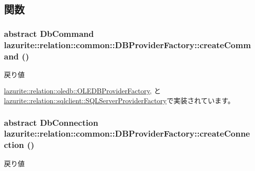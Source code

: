 \subsection{関数}
\hypertarget{classlazurite_1_1relation_1_1common_1_1_d_b_provider_factory_a80d5a53dcf06278b37133c7013f02f71}{
\subsubsection[{createCommand}]{\setlength{\rightskip}{0pt plus 5cm}abstract DbCommand lazurite::relation::common::DBProviderFactory::createCommand ()}}
\label{classlazurite_1_1relation_1_1common_1_1_d_b_provider_factory_a80d5a53dcf06278b37133c7013f02f71}
\begin{DoxyReturn}{戻り値}

\end{DoxyReturn}


\hyperlink{classlazurite_1_1relation_1_1oledb_1_1_o_l_e_d_b_provider_factory_a9cf2e12a8efe659885fd1e5fa014243f}{lazurite::relation::oledb::OLEDBProviderFactory}, と \hyperlink{classlazurite_1_1relation_1_1sqlclient_1_1_s_q_l_server_provider_factory_a2d33338154ebbd3abcfc8ca58aba0402}{lazurite::relation::sqlclient::SQLServerProviderFactory}で実装されています。\hypertarget{classlazurite_1_1relation_1_1common_1_1_d_b_provider_factory_a0b8ab4dd41d983170ee3c5903701597f}{
\subsubsection[{createConnection}]{\setlength{\rightskip}{0pt plus 5cm}abstract DbConnection lazurite::relation::common::DBProviderFactory::createConnection ()}}
\label{classlazurite_1_1relation_1_1common_1_1_d_b_provider_factory_a0b8ab4dd41d983170ee3c5903701597f}
\begin{DoxyReturn}{戻り値}

\end{DoxyReturn}


